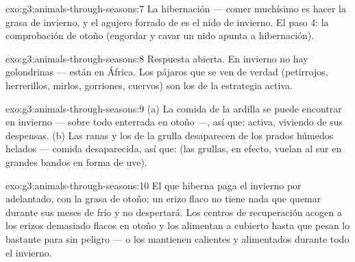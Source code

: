 \begin{solution}{exo:g3:animals-through-seasons:7}
La hibernación --- comer muchísimo es hacer la grasa de invierno, y el
agujero forrado de  es el nido de invierno. El paso 4: la
comprobación de otoño (engordar y cavar un nido apunta a hibernación).
\end{solution}

\begin{solution}{exo:g3:animals-through-seasons:8}
Respuesta abierta. En invierno no hay golondrinas --- están en África.
Los pájaros que se ven de verdad (petirrojos, herrerillos, mirlos,
gorriones, cuervos) son los de la estrategia activa.
\end{solution}

\begin{solution}{exo:g3:animals-through-seasons:9}
(a) La comida de la ardilla se puede encontrar en invierno ---
sobre todo enterrada en otoño ---, así que: activa, viviendo de sus
despensas. (b) Las ranas y los  de la grulla desaparecen de
los prados húmedos helados --- comida desaparecida, así que:
 (las grullas, en efecto, vuelan al sur en grandes bandos en
forma de uve).
\end{solution}

\begin{solution}{exo:g3:animals-through-seasons:10}
El que hiberna paga el invierno por adelantado, con la grasa de otoño;
un erizo flaco no tiene nada que quemar durante sus meses de 
frío y no despertará. Los centros de recuperación acogen a los erizos
demasiado flacos en otoño y los alimentan a cubierto hasta que pesan
lo bastante para  sin peligro --- o los mantienen calientes y
alimentados durante todo el invierno.
\end{solution}
